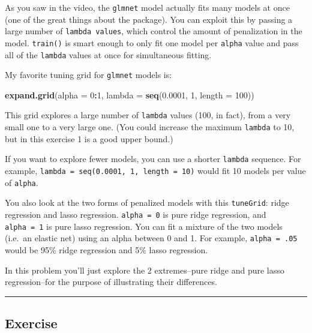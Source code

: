 \documentclass[
]{book}
\newenvironment{Shaded}{\begin{snugshade}}{\end{snugshade}}
\newcommand{\DataTypeTok}[1]{\textcolor[rgb]{0.13,0.29,0.53}{#1}}
\newcommand{\DecValTok}[1]{\textcolor[rgb]{0.00,0.00,0.81}{#1}}
\newcommand{\FloatTok}[1]{\textcolor[rgb]{0.00,0.00,0.81}{#1}}
\newcommand{\KeywordTok}[1]{\textcolor[rgb]{0.13,0.29,0.53}{\textbf{#1}}}
\newcommand{\NormalTok}[1]{#1}
\newcommand{\OperatorTok}[1]{\textcolor[rgb]{0.81,0.36,0.00}{\textbf{#1}}}
\begin{document}
As you saw in the video, the \texttt{glmnet} model actually fits many models at once (one of the great things about the package). You can exploit this by passing a large number of \texttt{lambda\ values}, which control the amount of penalization in the model. \texttt{train()} is smart enough to only fit one model per \texttt{alpha} value and pass all of the \texttt{lambda} values at once for simultaneous fitting.

My favorite tuning grid for \texttt{glmnet} models is:

\begin{Shaded}
\begin{Highlighting}[]
\KeywordTok{expand.grid}\NormalTok{(}\DataTypeTok{alpha =} \DecValTok{0}\OperatorTok{:}\DecValTok{1}\NormalTok{,}
            \DataTypeTok{lambda =} \KeywordTok{seq}\NormalTok{(}\FloatTok{0.0001}\NormalTok{, }\DecValTok{1}\NormalTok{, }\DataTypeTok{length =} \DecValTok{100}\NormalTok{))}
\end{Highlighting}
\end{Shaded}

This grid explores a large number of \texttt{lambda} values (100, in fact), from a very small one to a very large one. (You could increase the maximum \texttt{lambda} to 10, but in this exercise 1 is a good upper bound.)

If you want to explore fewer models, you can use a shorter \texttt{lambda} sequence. For example, \texttt{lambda\ =\ seq(0.0001,\ 1,\ length\ =\ 10)} would fit 10 models per value of \texttt{alpha}.

You also look at the two forms of penalized models with this \texttt{tuneGrid}: ridge regression and lasso regression. \texttt{alpha\ =\ 0} is pure ridge regression, and \texttt{alpha\ =\ 1} is pure lasso regression. You can fit a mixture of the two models (i.e.~an elastic net) using an alpha between 0 and 1. For example, \texttt{alpha\ =\ .05} would be 95\% ridge regression and 5\% lasso regression.

In this problem you'll just explore the 2 extremes--pure ridge and pure lasso regression--for the purpose of illustrating their differences.

\begin{center}\rule{0.5\linewidth}{0.5pt}\end{center}

\hypertarget{exercise-22}{%
\subsection*{Exercise}\label{exercise-22}}
\end{document}
